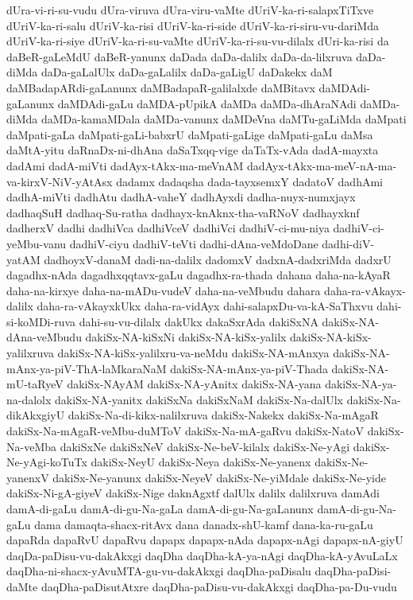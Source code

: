 {dUra-vi-ri-su-vudu
dUra-viruva
dUra-viru-vaMte
dUriV-ka-ri-salapxTiTxve
dUriV-ka-ri-salu
dUriV-ka-risi
dUriV-ka-ri-side
dUriV-ka-ri-siru-vu-dariMda
dUriV-ka-ri-siye
dUriV-ka-ri-su-vaMte
dUriV-ka-ri-su-vu-dilalx
dUri-ka-risi
da
daBeR-gaLeMdU
daBeR-yanunx
daDada
daDa-dalilx
daDa-da-lilxruva
daDa-diMda
daDa-gaLalUlx
daDa-gaLalilx
daDa-gaLigU
daDakekx
daM
daMBadapARdi-gaLanunx
daMBadapaR-galilalxde
daMBitavx
daMDAdi-gaLanunx
daMDAdi-gaLu
daMDA-pUpikA
daMDa
daMDa-dhAraNAdi
daMDa-diMda
daMDa-kamaMDala
daMDa-vanunx
daMDeVna
daMTu-gaLiMda
daMpati
daMpati-gaLa
daMpati-gaLi-babxrU
daMpati-gaLige
daMpati-gaLu
daMsa
daMtA-yitu
daRnaDx-ni-dhAna
daSaTxqq-vige
daTaTx-vAda
dadA-mayxta
dadAmi
dadA-miVti
dadAyx-tAkx-ma-meVnAM
dadAyx-tAkx-ma-meV-nA-ma-va-kirxV-NiV-yAtAsx
dadamx
dadaqsha
dada-tayxsemxY
dadatoV
dadhAmi
dadhA-miVti
dadhAtu
dadhA-vaheY
dadhAyxdi
dadha-nuyx-numxjayx
dadhaqSuH
dadhaq-Su-ratha
dadhayx-knAknx-tha-vaRNoV
dadhayxknf
dadherxV
dadhi
dadhiVca
dadhiVceV
dadhiVci
dadhiV-ci-mu-niya
dadhiV-ci-yeMbu-vanu
dadhiV-ciyu
dadhiV-teVti
dadhi-dAna-veMdoDane
dadhi-diV-yatAM
dadhoyxV-danaM
dadi-na-dalilx
dadomxV
dadxnA-dadxriMda
dadxrU
dagadhx-nAda
dagadhxqqtavx-gaLu
dagadhx-ra-thada
dahana
daha-na-kAyaR
daha-na-kirxye
daha-na-mADu-vudeV
daha-na-veMbudu
dahara
daha-ra-vAkayx-dalilx
daha-ra-vAkayxkUkx
daha-ra-vidAyx
dahi-salapxDu-va-kA-SaThxvu
dahi-si-koMDi-ruva
dahi-su-vu-dilalx
dakUkx
dakaSxrAda
dakiSxNA
dakiSx-NA-dAna-veMbudu
dakiSx-NA-kiSxNi
dakiSx-NA-kiSx-yalilx
dakiSx-NA-kiSx-yalilxruva
dakiSx-NA-kiSx-yalilxru-va-neMdu
dakiSx-NA-mAnxya
dakiSx-NA-mAnx-ya-piV-ThA-laMkaraNaM
dakiSx-NA-mAnx-ya-piV-Thada
dakiSx-NA-mU-taRyeV
dakiSx-NAyAM
dakiSx-NA-yAnitx
dakiSx-NA-yana
dakiSx-NA-ya-na-dalolx
dakiSx-NA-yanitx
dakiSxNa
dakiSxNaM
dakiSx-Na-dalUlx
dakiSx-Na-dikAkxgiyU
dakiSx-Na-di-kikx-nalilxruva
dakiSx-Nakekx
dakiSx-Na-mAgaR
dakiSx-Na-mAgaR-veMbu-duMToV
dakiSx-Na-mA-gaRvu
dakiSx-NatoV
dakiSx-Na-veMba
dakiSxNe
dakiSxNeV
dakiSx-Ne-beV-kilalx
dakiSx-Ne-yAgi
dakiSx-Ne-yAgi-koTuTx
dakiSx-NeyU
dakiSx-Neya
dakiSx-Ne-yanenx
dakiSx-Ne-yanenxV
dakiSx-Ne-yanunx
dakiSx-NeyeV
dakiSx-Ne-yiMdale
dakiSx-Ne-yide
dakiSx-Ni-gA-giyeV
dakiSx-Nige
daknAgxtf
dalUlx
dalilx
dalilxruva
damAdi
damA-di-gaLu
damA-di-gu-Na-gaLa
damA-di-gu-Na-gaLanunx
damA-di-gu-Na-gaLu
dama
damaqta-shacx-ritAvx
dana
danadx-shU-kamf
dana-ka-ru-gaLu
dapaRda
dapaRvU
dapaRvu
dapapx
dapapx-nAda
dapapx-nAgi
dapapx-nA-giyU
daqDa-paDisu-vu-dakAkxgi
daqDha
daqDha-kA-ya-nAgi
daqDha-kA-yAvuLaLx
daqDha-ni-shacx-yAvuMTA-gu-vu-dakAkxgi
daqDha-paDisalu
daqDha-paDisi-daMte
daqDha-paDisutAtxre
daqDha-paDisu-vu-dakAkxgi
daqDha-pa-Du-vudu
}
